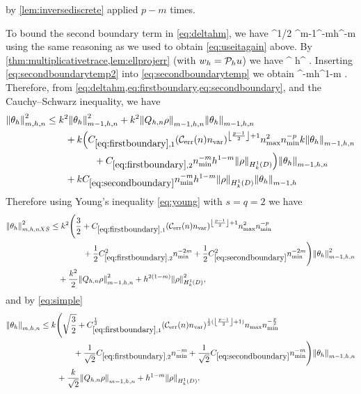 by \cref{lem:inversediscrete} applied $p-m$ times.

To bound the second boundary term in \cref{eq:deltahm}, we have
\beq\label{eq:secondboundarytemp}
 \leq \CMT \CinvVhp^{1/2} \Chinv^{m-1}\nmin^{-m}h^{\half-m}\NLtGI{\rho}
\eeq
using the same reasoning as we used to obtain \cref{eq:useitagain} above. By \cref{thm:multiplicativetrace,lem:ellprojerr} (with $w_{h} = \mathcal P_{h} u$) we have
\beq\label{eq:secondboundarytemp2}
\NLtGI{\rho} \leq \CMT {}^{\half} h^{\half} \NHokD{\rho}.
\eeq
Inserting \cref{eq:secondboundarytemp2} into \cref{eq:secondboundarytemp} we obtain
\beq\label{eq:secondboundary}
 \leq \CBth \nmin^{-m}h^{1-m} \NHokD{\rho} .
\eeq
Therefore, from\renewcommand{\creflastconjunction}{,~} \cref{eq:deltahm,eq:firstboundary,eq:secondboundary},\renewcommand{\creflastconjunction}{\lastconj} and the Cauchy--Schwarz inequality, we have
\begin{align*}
\Nfn{m,h,n}{\thetah}^2 &\leq k^2 \Nfn{m-1,h,n}{\thetah}^2 + k^2 \Nfn{m-1,h,n}{\Qhn \rho}\Nfn{m-1,h,n}{\thetah}\nonumber\\
&\quad\quad+ k\Big(\CBo \mleft(\En\nvar\mright)^{\floor{\frac{p-1}2}+1}\nmax^2\nmin^{-p}k \Nfn{m-1,h,n}{\thetah}\nonumber\\
&\quad\quad\quad\quad\quad+ \CBt \nmin^{-m}h^{1-m} \NHokD{\rho}\Big)\Nfn{m-1,h,n}{\thetah}\nonumber\\
&\quad\quad+ k\CBth \nmin^{-m}h^{1-m} \NHokD{\rho} \Nfn{m-1,h}{\thetah}%
\end{align*}
Therefore using Young's inequality \cref{eq:young} with $s=q=2$ we have
\begin{align*}
  \Nfn{m,h,nXS}{\thetah}^2 &\leq k^2\Bigg(\frac32 + \CBo \mleft(\En\nvar\mright)^{\floor{\frac{p-1}2}+1}\nmax^2\nmin^{-p}\\
  &\quad\quad\quad\quad+ \half \CBt^2 \nmin^{-2m} + \half\CBth^2 \nmin^{-2m}\Bigg)\Nfn{m-1,h,n}{\thetah}^2\\
&\quad+ \frac{k^2}2 \Nfn{m-1,h,n}{\Qhn \rho}^2 +  h^{2(1-m)} \NHokD{\rho}^2,
\end{align*}
and by \cref{eq:simple}
\begin{align}
  \Nfn{m,h,n}{\thetah} &\leq k\Bigg(\sqrt{\frac32} + \CBo^{\half} \mleft(\En\nvar\mright)^{\half(\floor{\frac{p-1}2}+1)}\nmax\nmin^{-\frac{p}2}\nonumber\\
  &\quad\quad\quad\quad+ \frac1{\sqrt{2}} \CBt \nmin^{-m} + \frac1{\sqrt{2}}\CBth \nmin^{-m}\Bigg)\Nfn{m-1,h,n}{\thetah}\nonumber\\
&\qquad+ \frac{k}{\sqrt{2}} \Nfn{m-1,h,n}{\Qhn \rho} +  h^{1-m} \NHokD{\rho}.\label{eq:thetahighnearly}
\end{align}


